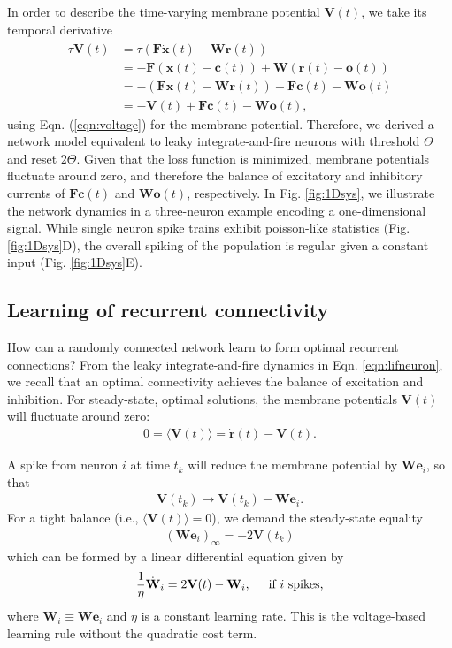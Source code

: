 \documentclass[twoside,twocolumn]{article}
\renewcommand{\b}[1]{\textbf{#1}}
\begin{document}
In order to describe the time-varying membrane potential $\b{V}(t)$, we take its temporal derivative
\begin{align}
\tau \dot{\b{V}}(t) &= \tau (\b{F}\dot{\b{x}}(t) - \b{W} \dot{\b{r}}(t)) \nonumber \\
&= -\b{F}(\b{x}(t)-\b{c}(t)) + \b{W} (\b{r}(t)-\b{o}(t)) \nonumber \\
&=  -(\b{F}\b{x}(t) - \b{W}\b{r}(t)) + \b{F}\b{c}(t) - \b{W}\b{o}(t)  \nonumber \\
&= -\b{V}(t) + \b{F}\b{c}(t) - \b{W}\b{o}(t), \label{eqn:lifneuron}
\end{align}
using Eqn. (\ref{eqn:voltage}) for the membrane potential. Therefore, we derived a network model equivalent to leaky integrate-and-fire neurons \cite{Stein1967} with threshold $\Theta$ and reset $2\Theta$. Given that the loss function is minimized, membrane potentials fluctuate around zero, and therefore the balance of excitatory and inhibitory currents of $\b{F}\b{c}(t)$ and $\b{W}\b{o}(t)$, respectively. In Fig. \ref{fig:1Dsys}, we illustrate the network dynamics in a three-neuron example encoding a one-dimensional signal. While single neuron spike trains exhibit poisson-like statistics (Fig. \ref{fig:1Dsys}D), the overall spiking of the population is regular given a constant input (Fig. \ref{fig:1Dsys}E).

 \subsection{Learning of recurrent connectivity}
 
 How can a randomly connected network learn to form optimal recurrent connections? From the leaky integrate-and-fire dynamics in Eqn. \ref{eqn:lifneuron}, we recall that an optimal connectivity achieves the balance of excitation and inhibition. For steady-state, optimal solutions, the membrane potentials $\b{V}(t)$ will fluctuate around zero:
\begin{align}
0 = \langle \b{V}(t) \rangle = \dot{\b{r}}(t) - \b{V}(t).
\end{align}

A spike from neuron $i$ at time $t_k$ will reduce the membrane potential by $\b{W}\b{e}_i$, so that 
\begin{align}
\b{V}(t_k) \rightarrow \b{V}(t_k) - \b{W}\b{e}_i. 
\end{align}
For a tight balance (i.e., $\langle \b{V}(t) \rangle = 0$), we demand the steady-state equality
\begin{align}
(\b{W}\b{e}_i)_\infty = -2\b{V}(t_k)
\end{align}
which can be formed by a linear differential equation given by
 \begin{align}
 \frac{1}{\eta}  \dot{\b{W}}_i =  2\b{V}(t) - \b{W}_i, \hspace{0.5cm} \textnormal{if }i \textnormal{ spikes,}
 \end{align}
 where $\b{W}_i \equiv \b{W}\b{e}_i$ and $\eta$ is a constant learning rate. This is the voltage-based learning rule without the quadratic cost term. 
 
\end{document}
